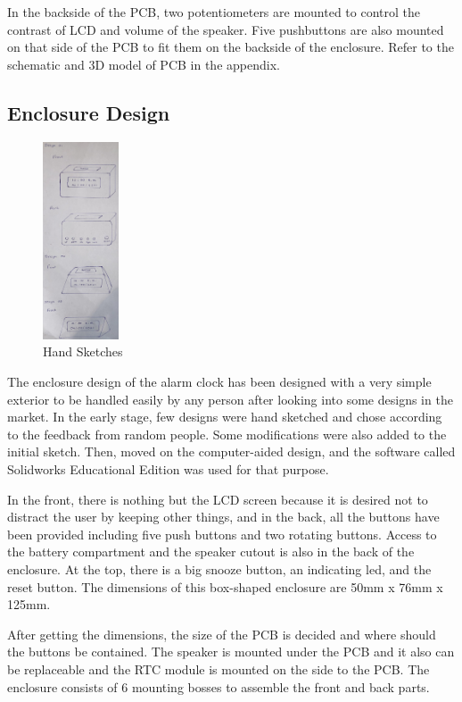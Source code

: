 \documentclass[12pt,twocolumn]{article}
\begin{document}
In the backside of the PCB, two potentiometers are mounted to control the contrast of LCD and volume
of the speaker. Five pushbuttons are also mounted on that side of the PCB to fit them on the backside
of the enclosure. Refer to the schematic and 3D model of PCB in the appendix.

    \subsection{Enclosure Design}

\begin{figure}     %
    \centering                        %
    \includegraphics[width=0.2\textwidth]{drawing}
    \caption*{Hand Sketches} 
\end{figure}
The enclosure design of the alarm clock has been designed with a very simple exterior to be handled
easily by any person after looking into some designs in the market. In the early stage, few designs
were hand sketched and chose according to the feedback from random people. Some modifications were
also added to the initial sketch. Then, moved on the computer-aided design, and the software called
Solidworks Educational Edition was used for that purpose. 
    
In the front, there is nothing but the LCD screen because it is desired not to distract the user by
keeping other things, and in the back, all the buttons have been provided including five push buttons
and two rotating buttons. Access to the battery compartment and the speaker cutout is also in the back
of the enclosure. At the top, there is a big snooze button, an indicating led, and the reset button.
The dimensions of this box-shaped enclosure are 50mm x 76mm x 125mm. 
    
After getting the dimensions, the size of the PCB is decided and where should the buttons be contained.
The speaker is mounted under the PCB and it also can be replaceable and the RTC module is mounted on
the side to the PCB. The enclosure consists of 6 mounting bosses to assemble the front and back parts.
\end{document}
